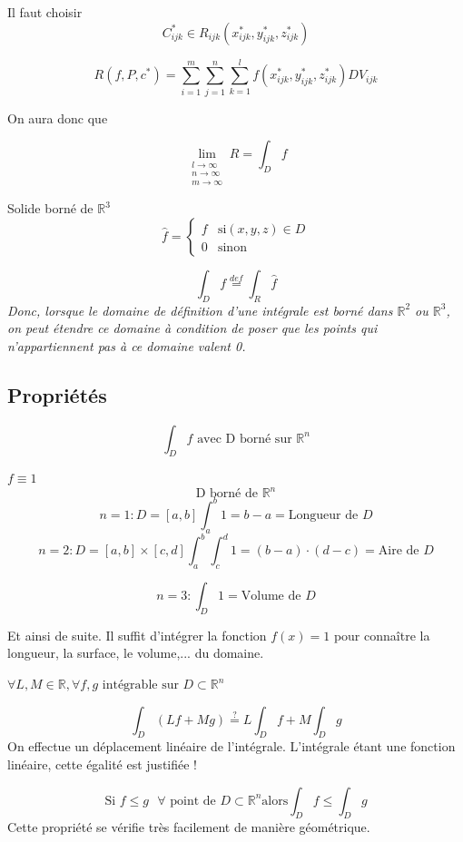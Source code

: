  Il faut choisir \[C_{ijk}^* \in R_{ijk} ( x_{ijk}^*,y_{ijk}^*,z_{ijk}^*)\]

\[R(f,P,c^*)=\sum_{i=1}^m \sum_{j=1}^n\sum_{k=1}^l f (x_{ijk}^*,y_{ijk}^*,z_{ijk}^*) D V_{ijk}\]

On aura donc que

$$\lim\limits_{\substack{l \to \infty \\ n \to \infty\\ m \to \infty}} R=\int_D f$$

Solide borné de $\mathbb{R}^3$
\[\hat{f}=
\left\{
\begin{array}{rr}
f & \text{si}(x,y,z)\in D \\
0 & \text{sinon}

\end{array}
\right.
\]

\[\int_D f \overset{def}{=} \int_R \hat{f}\]
\emph{
Donc, lorsque le domaine de définition d'une intégrale est borné dans $\mathbb{R}^2$ ou $\mathbb{R}^3$, on peut étendre ce domaine à condition de poser que les points qui n'appartiennent pas à ce domaine valent 0.}
\subsection{Propriétés}

\[\int_D f \text{ avec D borné sur } \mathbb{R}^n\]

\begin{myprop}
$f\equiv 1 $
\[\text{D borné de }\mathbb{R}^n\]
\[n=1 : D=[a,b] \int_a^b 1 = b-a = \text{Longueur de }D\]
\[n=2 : D=[a,b]\times[c,d] \int_a^b \int_c^d 1 = (b-a) \cdot (d-c)= \text{Aire de }D\]

\[n=3 : \int_D 1 = \text{Volume de }D\]

Et ainsi de suite. Il suffit d'intégrer la fonction $f(x) = 1$ pour connaître la longueur, la surface, le volume,... du domaine.
\end{myprop}


\begin{myprop}
$\forall L,M \in \mathbb{R} ,\forall f,g \text{ intégrable sur } D \subset \mathbb{R}^n$


\[\int_D(Lf+Mg)\overset{?}{=}L\int_D f + M \int_D g\]
On effectue un déplacement linéaire de l'intégrale. L'intégrale étant une fonction linéaire, cette égalité est justifiée !

\end{myprop}


\begin{myprop}
$$\text{Si } f \le  g  \text{ } \forall \text{ point de }D\subset \mathbb{R}^n \text{alors} \int_D f \le \int_D g $$
Cette propriété se vérifie très facilement de manière géométrique.
\end{myprop}

